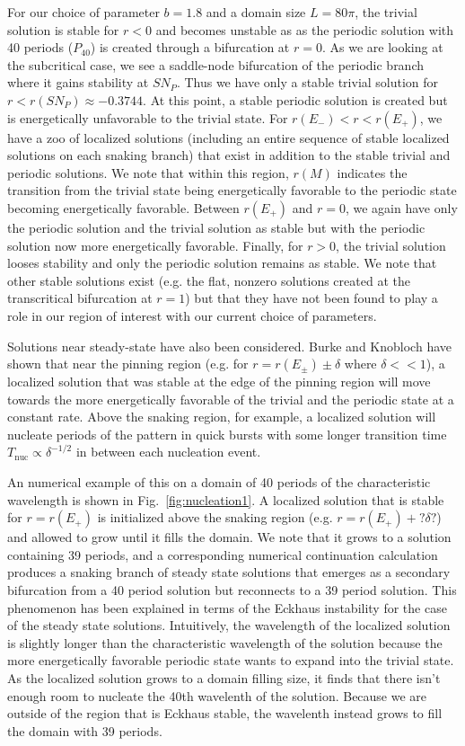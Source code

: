 \documentclass[../main/TimeForcingSHE.tex]{subfiles}
\begin{document}
For our choice of parameter $b=1.8$ and a domain size $L=80\pi$, the trivial solution is stable for $r<0$ and becomes unstable as as the periodic solution with 40 periods ($P_{40}$) is created through a bifurcation at $r=0$.  As we are looking at the subcritical case, we see a saddle-node bifurcation of the periodic branch where it gains stability at $SN_P$.  Thus we have only a stable trivial solution for $r<r(SN_P)\approx -0.3744$. At this point, a stable periodic solution is created but is energetically unfavorable to the trivial state.  For $r(E_-)<r<r(E_+)$, we have a zoo of localized solutions (including an entire sequence of stable localized solutions on each snaking branch) that exist in addition to the stable trivial and periodic solutions.  We note that within this region, $r(M)$ indicates the transition from the trivial state being energetically favorable to the periodic state becoming energetically favorable.  Between $r(E_+)$ and $r=0$, we again have only the periodic solution and the trivial solution as stable  but with the periodic solution now more energetically favorable.   Finally, for $r>0$, the trivial solution looses stability and only the periodic solution remains as stable.  We note that other stable solutions exist (e.g. the flat, nonzero solutions created at the transcritical bifurcation at $r=1$) but that they have not been found to play a role in our region of interest with our current choice of parameters. 

Solutions near steady-state have also been considered.  Burke and Knobloch \cite{burke2006} have shown that near the pinning region (e.g. for $r=r(E_{\pm})\pm\delta$ where $\delta <<1$), a localized solution that was stable at the edge of the pinning region will move towards the more energetically favorable of the trivial and the periodic state at a constant rate.  Above the snaking region, for example, a localized solution will nucleate periods of the pattern in quick bursts with some longer transition time $T_{\text{nuc}}\propto \delta^{-1/2}$ in between each nucleation event.  

An numerical example of this on a domain of 40 periods of the characteristic wavelength is shown in Fig.~\ref{fig:nucleation1}.  A localized solution that is stable for $r=r(E_+)$ is initialized above the snaking region (e.g. $r=r(E_+)+ ?\delta?$) and allowed to grow until it fills the domain. We note that it grows to a solution containing 39 periods, and a corresponding numerical continuation calculation produces a snaking branch of steady state solutions that emerges as a secondary bifurcation from a 40 period solution but reconnects to a 39 period solution.  This phenomenon has been explained \cite{bergeon2008} in terms of the Eckhaus instability for the case of the steady state solutions.  Intuitively, the wavelength of the localized solution is slightly longer than the characteristic wavelength of the solution because the more energetically favorable periodic state wants to expand into the trivial state.  As the localized solution grows to a domain filling size, it finds that there isn't enough room to nucleate the 40th wavelenth of the solution.  Because we are outside of the region that is Eckhaus stable, the wavelenth instead grows to fill the domain with 39 periods.
\end{document}
